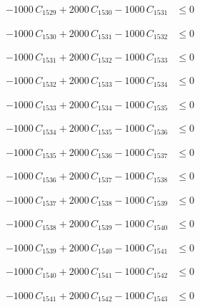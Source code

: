 \documentclass[a4paper,11pt]{article}
\begin{document}
\begin{align}
-1000\,C_{1529} + 2000\,C_{1530} - 1000\,C_{1531} &\leq 0 \nonumber
\end{align}

\begin{align}
-1000\,C_{1530} + 2000\,C_{1531} - 1000\,C_{1532} &\leq 0 \nonumber
\end{align}

\begin{align}
-1000\,C_{1531} + 2000\,C_{1532} - 1000\,C_{1533} &\leq 0 \nonumber
\end{align}

\begin{align}
-1000\,C_{1532} + 2000\,C_{1533} - 1000\,C_{1534} &\leq 0 \nonumber
\end{align}

\begin{align}
-1000\,C_{1533} + 2000\,C_{1534} - 1000\,C_{1535} &\leq 0 \nonumber
\end{align}

\begin{align}
-1000\,C_{1534} + 2000\,C_{1535} - 1000\,C_{1536} &\leq 0 \nonumber
\end{align}

\begin{align}
-1000\,C_{1535} + 2000\,C_{1536} - 1000\,C_{1537} &\leq 0 \nonumber
\end{align}

\begin{align}
-1000\,C_{1536} + 2000\,C_{1537} - 1000\,C_{1538} &\leq 0 \nonumber
\end{align}

\begin{align}
-1000\,C_{1537} + 2000\,C_{1538} - 1000\,C_{1539} &\leq 0 \nonumber
\end{align}

\begin{align}
-1000\,C_{1538} + 2000\,C_{1539} - 1000\,C_{1540} &\leq 0 \nonumber
\end{align}

\begin{align}
-1000\,C_{1539} + 2000\,C_{1540} - 1000\,C_{1541} &\leq 0 \nonumber
\end{align}

\begin{align}
-1000\,C_{1540} + 2000\,C_{1541} - 1000\,C_{1542} &\leq 0 \nonumber
\end{align}

\begin{align}
-1000\,C_{1541} + 2000\,C_{1542} - 1000\,C_{1543} &\leq 0 \nonumber
\end{align}
\end{document}
